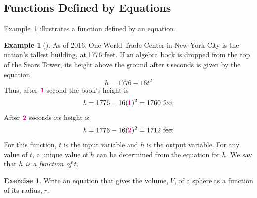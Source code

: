 \documentclass[10pt,]{book}
\theoremstyle{plain}
\theoremstyle{definition}
\theoremstyle{definition}
\newtheorem{example}[theorem]{Example}
\theoremstyle{definition}
\theoremstyle{definition}
\newtheorem{exercise}[theorem]{Exercise}
\numberwithin{equation}{part}
\newcommand{\alert}[1]{\boldsymbol{\color{magenta}{#1}}}
\begin{document}
\subsection[{Functions Defined by Equations}]{Functions Defined by Equations}\label{subsection-10}
\hyperref[example-falling-book]{Example~\ref{example-falling-book}} illustrates a function defined by an equation.%
\begin{example}[]\label{example-falling-book}
As of 2016,  One World Trade Center in New York City is the nation’s tallest building, at 1776 feet. If an algebra book is dropped from the top of the Sears Tower, its height above the ground after \(t\) seconds is given by the equation%
\begin{equation*}
h = 1776 - 16t^2
\end{equation*}
Thus, after \(\alert{1}\) second the book’s height is%
\begin{equation*}
h = 1776 - 16(\alert{1})^2 = 1760 \text{ feet}
\end{equation*}
After \(\alert{2}\) seconds its height is%
\begin{equation*}
h = 1776 - 16(\alert{2})^2 = 1712 \text{ feet}
\end{equation*}
For this function, \(t\) is the input variable and \(h\) is the output variable. For any value of \(t\), a unique value of \(h\) can be determined from the equation for \(h\). We say that \(h\) \emph{is a function of} \(t\).%
\end{example}
\begin{exercise}\label{exercise-63}
Write an equation that gives the volume, \(V\), of a sphere as a function of its radius, \(r\).\end{exercise}
\end{document}
